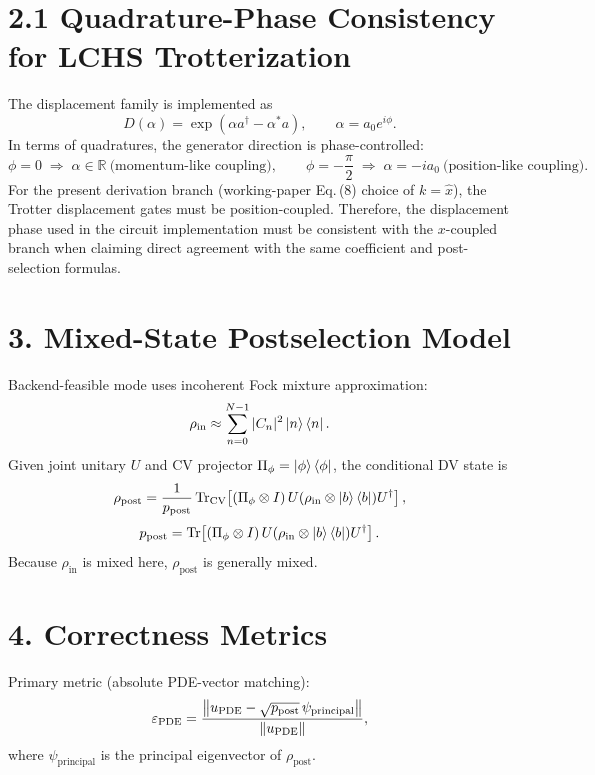 \documentclass[11pt]{article}
\begin{document}
\section*{2.1 Quadrature-Phase Consistency for LCHS Trotterization}
The displacement family is implemented as
\begin{equation}
D(\alpha)=\exp(\alpha a^\dagger-\alpha^* a), \qquad \alpha=a_0 e^{i\phi}.
\end{equation}
In terms of quadratures, the generator direction is phase-controlled:
\begin{equation}
\phi=0 \;\Rightarrow\; \alpha\in\mathbb{R}\ \text{(momentum-like coupling)},\qquad
\phi=-\frac{\pi}{2}\;\Rightarrow\; \alpha=-i a_0\ \text{(position-like coupling)}.
\end{equation}
For the present derivation branch (working-paper Eq.\,(8) choice of $k=\hat x$), the Trotter displacement gates must be position-coupled. Therefore, the displacement phase used in the circuit implementation must be consistent with the $x$-coupled branch when claiming direct agreement with the same coefficient and post-selection formulas.

\section*{3. Mixed-State Postselection Model}
Backend-feasible mode uses incoherent Fock mixture approximation:
\begin{equation}
\rho_{\mathrm{in}}\approx\sum_{n=0}^{N-1}|C_n|^2\ket{n}\bra{n}.
\end{equation}
Given joint unitary $U$ and CV projector $\Pi_{\phi}=\ket{\phi}\bra{\phi}$, the conditional DV state is
\begin{equation}
\rho_{\mathrm{post}}
=\frac{1}{p_{\mathrm{post}}}
\Tr_{\mathrm{CV}}\!\left[
(\Pi_\phi\otimes I)\,U(\rho_{\mathrm{in}}\otimes \ket{b}\bra{b})U^\dagger
\right],
\end{equation}
\begin{equation}
p_{\mathrm{post}}=
\Tr\!\left[
(\Pi_\phi\otimes I)\,U(\rho_{\mathrm{in}}\otimes \ket{b}\bra{b})U^\dagger
\right].
\end{equation}
Because $\rho_{\mathrm{in}}$ is mixed here, $\rho_{\mathrm{post}}$ is generally mixed.

\section*{4. Correctness Metrics}
Primary metric (absolute PDE-vector matching):
\begin{equation}
\varepsilon_{\mathrm{PDE}}
=\frac{\norm{u_{\mathrm{PDE}}-\sqrt{p_{\mathrm{post}}}\,\psi_{\mathrm{principal}}}}
{\norm{u_{\mathrm{PDE}}}},
\end{equation}
where $\psi_{\mathrm{principal}}$ is the principal eigenvector of $\rho_{\mathrm{post}}$.
\end{document}
